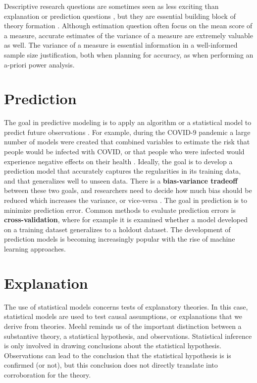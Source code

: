 \documentclass[
  oneside]{book}
\begin{document}
Descriptive research questions are sometimes seen as less exciting than explanation or prediction questions \citep{gerring_mere_2012}, but they are essential building block of theory formation \citep{scheel_why_2021}. Although estimation question often focus on the mean score of a measure, accurate estimates of the variance of a measure are extremely valuable as well. The variance of a measure is essential information in a well-informed sample size justification, both when planning for accuracy, as when performing an a-priori power analysis.

\hypertarget{prediction}{%
\section{Prediction}\label{prediction}}

The goal in predictive modeling is to apply an algorithm or a statistical model to predict future observations \citep{shmueli_explain_2010}. For example, during the COVID-9 pandemic a large number of models were created that combined variables to estimate the risk that people would be infected with COVID, or that people who were infected would experience negative effects on their health \citep{wynants_prediction_2020}. Ideally, the goal is to develop a prediction model that accurately captures the regularities in its training data, and that generalizes well to unseen data. There is a \textbf{bias-variance tradeoff} between these two goals, and researchers need to decide how much bias should be reduced which increases the variance, or vice-versa \citep{yarkoni_choosing_2017}. The goal in prediction is to minimize prediction error. Common methods to evaluate prediction errors is \textbf{cross-validation}, where for example it is examined whether a model developed on a training dataset generalizes to a holdout dataset. The development of prediction models is becoming increasingly popular with the rise of machine learning approaches.

\hypertarget{explanation}{%
\section{Explanation}\label{explanation}}

The use of statistical models concerns tests of explanatory theories. In this case, statistical models are used to test causal assumptions, or explanations that we derive from theories.
Meehl \citeyearpar{meehl_appraising_1990} reminds us of the important distinction between a substantive theory, a statistical hypothesis, and observations. Statistical inference is only involved in drawing conclusions about the statistical hypothesis. Observations can lead to the conclusion that the statistical hypothesis is is confirmed (or not), but this conclusion does not directly translate into corroboration for the theory.
\end{document}
